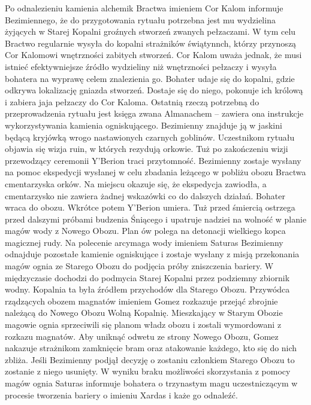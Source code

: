 \documentclass[11pt,polish, openany]{book}
\begin{document}
Po odnalezieniu kamienia alchemik Bractwa imieniem Cor Kalom informuje Bezimiennego, że do przygotowania rytuału potrzebna jest mu wydzielina żyjących w Starej Kopalni groźnych stworzeń zwanych pełzaczami. W tym celu Bractwo regularnie wysyła do kopalni strażników świątynnch, którzy przynoszą Cor Kalomowi wnętrzności zabitych stworzeń. Cor Kalom uważa jednak, że musi istnieć efektywniejsze źródło wydzieliny niż wnętrzności pełzaczy i wysyła bohatera na wyprawę celem znalezienia go. Bohater udaje się do kopalni, gdzie odkrywa lokalizację gniazda stworzeń. Dostaje się do niego, pokonuje ich królową i zabiera jaja pełzaczy do Cor Kaloma. Ostatnią rzeczą potrzebną do przeprowadzenia rytuału jest księga zwana Almanachem – zawiera ona instrukcje wykorzystywania kamienia ogniskującego. Bezimienny znajduje ją w jaskini będącą kryjówką wrogo nastawionych czarnych goblinów.
Uczestnikom rytuału objawia się wizja ruin, w których rezydują orkowie. Tuż po zakończeniu wizji przewodzący ceremonii Y'Berion traci przytomność. Bezimienny zostaje wysłany na pomoc ekspedycji wysłanej w celu zbadania leżącego w pobliżu obozu Bractwa cmentarzyska orków. Na miejscu okazuje się, że ekspedycja zawiodła, a cmentarzysko nie zawiera żadnej wskazówki co do dalszych działań. Bohater wraca do obozu. Wkrótce potem Y'Berion umiera. Tuż przed śmiercią ostrzega przed dalszymi próbami budzenia Śniącego i upatruje nadziei na wolność w planie magów wody z Nowego Obozu. Plan ów polega na detonacji wielkiego kopca magicznej rudy. Na polecenie arcymaga wody imieniem Saturas Bezimienny odnajduje pozostałe kamienie ogniskujące i zostaje wysłany z misją przekonania magów ognia ze Starego Obozu do podjęcia próby zniszczenia bariery.
W międzyczasie dochodzi do podmycia Starej Kopalni przez podziemny zbiornik wodny. Kopalnia ta była źródłem przychodów dla Starego Obozu. Przywódca rządzących obozem magnatów imieniem Gomez rozkazuje przejąć zbrojnie należącą do Nowego Obozu Wolną Kopalnię. Mieszkający w Starym Obozie magowie ognia sprzeciwili się planom władz obozu i zostali wymordowani z rozkazu magnatów. Aby uniknąć odwetu ze strony Nowego Obozu, Gomez nakazuje strażnikom zamknięcie bram oraz atakowanie każdego, kto się do nich zbliża. Jeśli Bezimienny podjął decyzję o zostaniu członkiem Starego Obozu to zostanie z niego usunięty. W wyniku braku możliwości skorzystania z pomocy magów ognia Saturas informuje bohatera o trzynastym magu uczestniczącym w procesie tworzenia bariery o imieniu Xardas i każe go odnaleźć.
\newline
\end{document}
